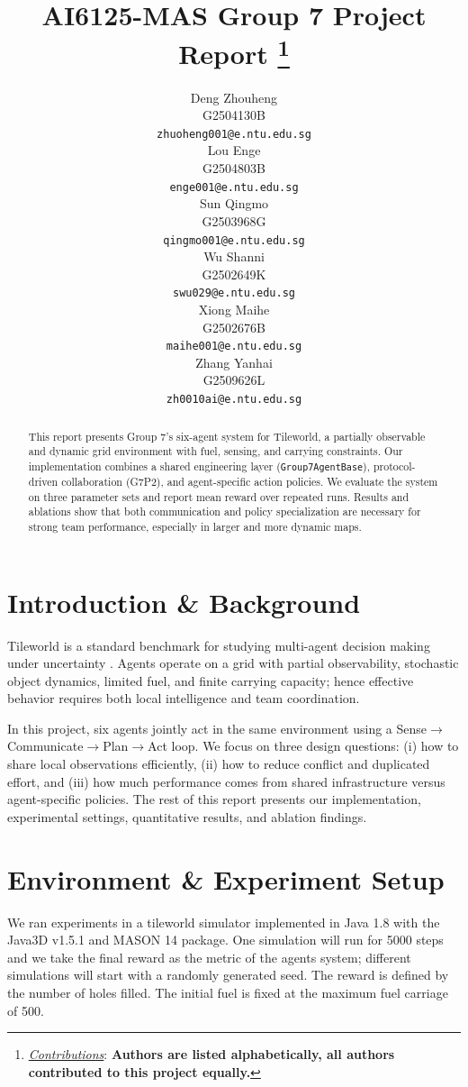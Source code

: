 \documentclass{article}
\title{AI6125-MAS Group 7 Project Report
\thanks{\textit{\underline{Contributions}}: 
\textbf{Authors are listed alphabetically, all authors contributed to this project equally.}} 
}
\author{
  Deng Zhouheng \\
  G2504130B \\
  \texttt{zhuoheng001@e.ntu.edu.sg} \\
   \And
  Lou Enge \\
  G2504803B \\
  \texttt{enge001@e.ntu.edu.sg} \\
   \And
  Sun Qingmo \\
  G2503968G \\
  \texttt{qingmo001@e.ntu.edu.sg} \\
   \And
  Wu Shanni \\
  G2502649K \\
  \texttt{swu029@e.ntu.edu.sg} \\
   \And
  Xiong Maihe \\
  G2502676B \\
  \texttt{maihe001@e.ntu.edu.sg} \\
   \And
  Zhang Yanhai \\
  G2509626L \\
  \texttt{zh0010ai@e.ntu.edu.sg} \\
}
\begin{document}
\maketitle

\begin{abstract}
This report presents Group 7's six-agent system for Tileworld, a partially observable and dynamic grid environment with fuel, sensing, and carrying constraints.
Our implementation combines a shared engineering layer (\texttt{Group7AgentBase}), protocol-driven collaboration (G7P2), and agent-specific action policies.
We evaluate the system on three parameter sets and report mean reward over repeated runs.
Results and ablations show that both communication and policy specialization are necessary for strong team performance, especially in larger and more dynamic maps.
\end{abstract}


\section{Introduction \& Background}

Tileworld is a standard benchmark for studying multi-agent decision making under uncertainty \cite{intro2tileworld,hist_tileworld}. Agents operate on a grid with partial observability, stochastic object dynamics, limited fuel, and finite carrying capacity; hence effective behavior requires both local intelligence and team coordination.

In this project, six agents jointly act in the same environment using a Sense$\rightarrow$Communicate$\rightarrow$Plan$\rightarrow$Act loop. We focus on three design questions: (i) how to share local observations efficiently, (ii) how to reduce conflict and duplicated effort, and (iii) how much performance comes from shared infrastructure versus agent-specific policies. The rest of this report presents our implementation, experimental settings, quantitative results, and ablation findings.

\section{Environment \& Experiment Setup}

We ran experiments in a tileworld simulator implemented in Java 1.8 with the Java3D v1.5.1 and MASON 14 package. One simulation will run for 5000 steps and we take the final reward as the metric of the agents system; 
different simulations will start with a randomly generated seed. 
The reward is defined by the number of holes filled. The initial fuel is fixed at the maximum fuel carriage of 500.
\end{document}
